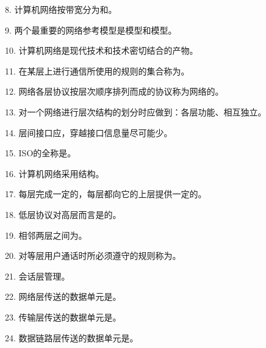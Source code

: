 8. 计算机网络按带宽分为\underline{\hspace{2cm}}和\underline{\hspace{2cm}}。

9. 两个最重要的网络参考模型是\underline{\hspace{2cm}}模型和\underline{\hspace{2cm}}模型。

10. 计算机网络是现代\underline{\hspace{2cm}}技术和\underline{\hspace{2cm}}技术密切结合的产物。

11. 在某层上进行通信所使用的规则的集合称为\underline{\hspace{2cm}}。

12. 网络各层协议按层次顺序排列而成的协议称为网络的\underline{\hspace{2cm}}。

13. 对一个网络进行层次结构的划分时应做到：各层功能\underline{\hspace{2cm}}、相互独立。

14. 层间接口应\underline{\hspace{2cm}}，穿越接口信息量尽可能少。

15. ISO的全称是\underline{\hspace{4cm}}。

16. 计算机网络采用\underline{\hspace{2cm}}结构。

17. 每层完成一定的\underline{\hspace{2cm}}，每层都向它的上层提供一定的\underline{\hspace{2cm}}。

18. 低层协议对高层而言是\underline{\hspace{2cm}}的。

19. 相邻两层之间为\underline{\hspace{2cm}}。

20. 对等层用户通话时所必须遵守的规则称为\underline{\hspace{2cm}}。

21. 会话层管理\underline{\hspace{4cm}}。

22. 网络层传送的数据单元是\underline{\hspace{2cm}}。

23. 传输层传送的数据单元是\underline{\hspace{2cm}}。

24. 数据链路层传送的数据单元是\underline{\hspace{2cm}}。

